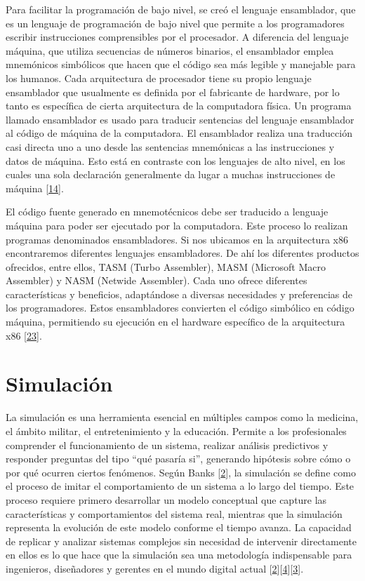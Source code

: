 \documentclass[12pt,twoside]{templates/unerthesis}
\begin{document}
Para facilitar la programación de bajo nivel, se creó el lenguaje ensamblador, que es un lenguaje de programación de bajo nivel que permite a los programadores escribir instrucciones comprensibles por el procesador. A diferencia del lenguaje máquina, que utiliza secuencias de números binarios, el ensamblador emplea mnemónicos simbólicos que hacen que el código sea más legible y manejable para los humanos. Cada arquitectura de procesador tiene su propio lenguaje ensamblador que usualmente es definida por el fabricante de hardware, por lo tanto es específica de cierta arquitectura de la computadora física. Un programa llamado ensamblador es usado para traducir sentencias del lenguaje ensamblador al código de máquina de la computadora. El ensamblador realiza una traducción casi directa uno a uno desde las sentencias mnemónicas a las instrucciones y datos de máquina. Esto está en contraste con los lenguajes de alto nivel, en los cuales una sola declaración generalmente da lugar a muchas instrucciones de máquina {[}\protect\hyperlink{ref-stallings_computer_2013}{14}{]}.

El código fuente generado en mnemotécnicos debe ser traducido a lenguaje máquina para poder ser ejecutado por la computadora. Este proceso lo realizan programas denominados ensambladores. Si nos ubicamos en la arquitectura x86 encontraremos diferentes lenguajes ensambladores. De ahí los diferentes productos ofrecidos, entre ellos, TASM (Turbo Assembler), MASM (Microsoft Macro Assembler) y NASM (Netwide Assembler). Cada uno ofrece diferentes características y beneficios, adaptándose a diversas necesidades y preferencias de los programadores. Estos ensambladores convierten el código simbólico en código máquina, permitiendo su ejecución en el hardware específico de la arquitectura x86 {[}\protect\hyperlink{ref-hyde2010art}{23}{]}.

\hypertarget{simulaciuxf3n}{%
\section{Simulación}\label{simulaciuxf3n}}

La simulación es una herramienta esencial en múltiples campos como la medicina, el ámbito militar, el entretenimiento y la educación. Permite a los profesionales comprender el funcionamiento de un sistema, realizar análisis predictivos y responder preguntas del tipo ``qué pasaría si'', generando hipótesis sobre cómo o por qué ocurren ciertos fenómenos. Según Banks {[}\protect\hyperlink{ref-banks_discrete-event_2010}{2}{]}, la simulación se define como el proceso de imitar el comportamiento de un sistema a lo largo del tiempo. Este proceso requiere primero desarrollar un modelo conceptual que capture las características y comportamientos del sistema real, mientras que la simulación representa la evolución de este modelo conforme el tiempo avanza. La capacidad de replicar y analizar sistemas complejos sin necesidad de intervenir directamente en ellos es lo que hace que la simulación sea una metodología indispensable para ingenieros, diseñadores y gerentes en el mundo digital actual {[}\protect\hyperlink{ref-banks_discrete-event_2010}{2}{]}{[}\protect\hyperlink{ref-robinson_simulation_2014}{4}{]}{[}\protect\hyperlink{ref-law_simulation_2015}{3}{]}.
\end{document}
